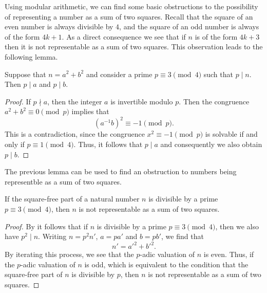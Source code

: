 Using modular arithmetic, we can find some basic obstructions to the possibility of representing a number as a sum of two squares. Recall that the square of an even number is always divisible by $4$, and the square of an odd number is always of the form $4k+1$. As a direct consequence we see that if $n$ is of the form $4k+3$ then it is not representable as a sum of two squares. This observation leads to the following lemma.

\begin{lemma}\label{lemma:div-3-mod-4-sum-of-squares}
  Suppose that $n=a^2+b^2$ and consider a prime $p\equiv 3\pmod{4}$ such that $p\mid n$. Then $p\mid a$ and $p\mid b$.
\end{lemma}

\begin{proof}
  If $p\nmid a$, then the integer $a$ is invertible modulo $p$. Then the congruence $a^2+b^2\equiv 0\pmod{p}$ implies that
  \begin{equation*}
    (a^{-1}b)^2\equiv -1\pmod{p}.
  \end{equation*}
  This is a contradiction, since the congruence $x^2\equiv -1\pmod{p}$ is solvable if and only if $p\equiv 1\pmod{4}$. Thus, it follows that $p\mid a$ and consequently we also obtain $p\mid b$.
\end{proof}

The previous lemma can be used to find an obstruction to numbers being representble as a sum of two squares.

\begin{corollary}\label{corollary:obstruction-sum-of-two-squares}
  If the square-free part of a natural number $n$ is divisible by a prime $p\equiv 3\pmod{4}$, then $n$ is not representable as a sum of two squares.
\end{corollary}

\begin{proof}
  By  it follows that if $n$ is divisible by a prime $p\equiv 3\pmod{4}$, then we also have $p^2\mid n$. Writing $n=p^2n'$, $a=pa'$ and $b=pb'$, we find that
  \begin{equation*}
    n' = a'^2+b'^2.
  \end{equation*}
  By iterating this process, we see that the $p$-adic valuation of $n$ is even. Thus, if the $p$-adic valuation of $n$ is odd, which is equivalent to the condition that the square-free part of $n$ is divisible by $p$, then $n$ is not representable as a sum of two squares.
\end{proof}


